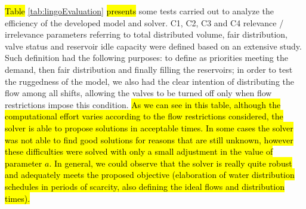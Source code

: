 \documentclass{singlecol}
\theoremstyle{TH}{
\newtheorem{lemma}{Lemma}
\newtheorem{theorem}[lemma]{Theorem}
\newtheorem{corrolary}[lemma]{Corrolary}
\newtheorem{conjecture}[lemma]{Conjecture}
\newtheorem{proposition}[lemma]{Proposition}
\newtheorem{claim}[lemma]{Claim}
\newtheorem{stheorem}[lemma]{Wrong Theorem}
\newtheorem{algorithm}{Algorithm}
}
\theoremstyle{THrm}{
\newtheorem{definition}{Definition}[section]
\newtheorem{question}{Question}[section]
\newtheorem{remark}{Remark}
\newtheorem{scheme}{Scheme}
}
\theoremstyle{THhit}{
\newtheorem{case}{Case}[section]
}
\begin{document}
\hl{Table} \ref{tab:lingoEvaluation} \hl{presents} some tests carried out to analyze the efficiency of the developed model and solver. C1, C2, C3 and C4 relevance / irrelevance parameters referring to total distributed volume, fair distribution, valve status and reservoir idle capacity were defined based on an extensive study. Such definition had the following purposes: to define as priorities meeting the demand, then fair distribution and finally filling the reservoirs; in order to test the ruggedness of the model, we also had the clear intention of distributing the flow among all shifts, allowing the valves to be turned off only when flow restrictions impose this condition. \hl{As we can see in this table, although the computational effort varies according to the flow restrictions considered, the solver is able to propose solutions in acceptable times. In some cases the solver was not able to find good solutions for reasons that are still unknown, however these difficulties were solved with only a small adjustment in the value of parameter $a$. In general, we could observe that the solver is really quite robust and adequately meets the proposed objective (elaboration of water distribution schedules in periods of scarcity, also defining the ideal flows and distribution times).} 
\end{document}
